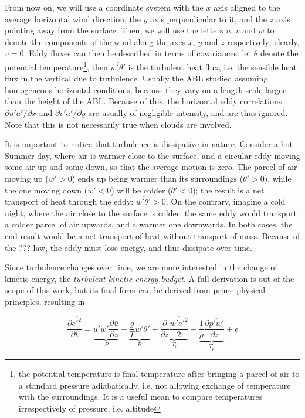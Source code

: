 \documentclass[a4paper]{book}
\begin{document}
From now on, we will use a coordinate system with the $x$ axis aligned to the average horizontal wind direction, the $y$ axis perpendicular to it, and the $z$ axis pointing away from the surface. Then, we will use the letters $u$, $v$ and $w$ to denote the components of the wind along the axes $x$, $y$ and $z$ respectively; clearly, $\overline{v}=0$. Eddy fluxes can then be described in terms of covariances: let $\theta$ denote the potential temperature\footnote{the potential temperature is final temperature after bringing a parcel of air to a standard pressure adiabatically, i.e. not allowing exchange of temperature with the surroundings. It is a useful mean to compare temperatures irrespectively of pressure, i.e. altitude}, then $\overline{w'\theta'}$ is the turbulent heat flux, i.e. the sensible heat flux in the vertical due to turbulence. Usually the ABL  studied assuming homogeneous horizontal conditions, because they vary on a length scale larger than the height of the ABL. Because of this, the horizontal eddy correlations $\partial\overline{u'a'}/\partial x$ and $\partial\overline{v'a'}/\partial y$ are usually of negligible intensity, and are thus ignored. Note that this is not necessarily true when clouds are involved.

It is important to notice that turbulence is dissipative in nature. Consider a hot Summer day, where air is warmer close to the surface, and a circular eddy moving some air up and some down, so that the average motion is zero. The parcel of air moving up ($w'>0$) ends up being warmer than its surroundings ($\theta'>0$), while the one moving down ($w'<0$) will be colder ($\theta'<0$); the result is a net transport of heat through the eddy: $\overline{w'\theta'}>0$. On the contrary, imagine a cold night, where the air close to the surface is colder; the same eddy would transport a colder parcel of air upwards, and a warmer one downwards. In both cases, the end result would be a net transport of heat without transport of mass. Because of the ??? law, the eddy must lose energy, and thus dissipate over time.

Since turbulence changes over time, we are more interested in the change of kinetic energy, the \emph{turbulent kinetic energy budget}. A full derivation is out of the scope of this work, but its final form \citep{basicatm} can be derived from prime physical principles, resulting in

\begin{equation}
\frac{\partial\overline{{e'}^2}}{\partial t}
=\underbrace{\overline{u'w'}\frac{\partial\overline{u}}{\partial z}}_P
-\underbrace{\frac{g}{T}\overline{w'\theta'}}_B
+\underbrace{\frac{\partial}{\partial z}\frac{\overline{w'{e'}^2}}{2}}_{T_t}
+\underbrace{\frac{1}{\rho}\frac{\partial\overline{p'w'}}{\partial z}}_{T_p}
+\epsilon
\end{equation}
\end{document}
